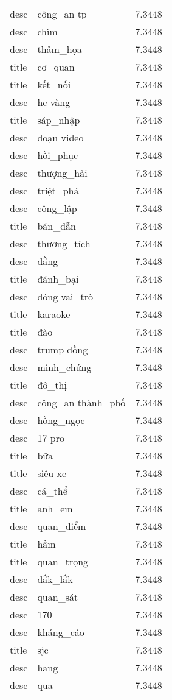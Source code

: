 \documentclass{article}
\begin{document}
\begin{tabular}{lll}
desc & công\_an tp & 7.3448\\
desc & chìm & 7.3448\\
desc & thảm\_họa & 7.3448\\
title & cơ\_quan & 7.3448\\
title & kết\_nối & 7.3448\\
desc & hc vàng & 7.3448\\
title & sáp\_nhập & 7.3448\\
desc & đoạn video & 7.3448\\
desc & hồi\_phục & 7.3448\\
desc & thượng\_hải & 7.3448\\
desc & triệt\_phá & 7.3448\\
desc & công\_lập & 7.3448\\
title & bán\_dẫn & 7.3448\\
desc & thương\_tích & 7.3448\\
desc & đằng & 7.3448\\
title & đánh\_bại & 7.3448\\
desc & đóng vai\_trò & 7.3448\\
title & karaoke & 7.3448\\
title & đào & 7.3448\\
desc & trump đồng & 7.3448\\
desc & minh\_chứng & 7.3448\\
title & đô\_thị & 7.3448\\
desc & công\_an thành\_phố & 7.3448\\
desc & hồng\_ngọc & 7.3448\\
desc & 17 pro & 7.3448\\
title & bữa & 7.3448\\
title & siêu xe & 7.3448\\
desc & cá\_thể & 7.3448\\
title & anh\_em & 7.3448\\
desc & quan\_điểm & 7.3448\\
title & hầm & 7.3448\\
title & quan\_trọng & 7.3448\\
desc & đắk\_lắk & 7.3448\\
desc & quan\_sát & 7.3448\\
desc & 170 & 7.3448\\
desc & kháng\_cáo & 7.3448\\
title & sjc & 7.3448\\
desc & hang & 7.3448\\
desc & qua & 7.3448\\

\end{tabular}
\end{document}
